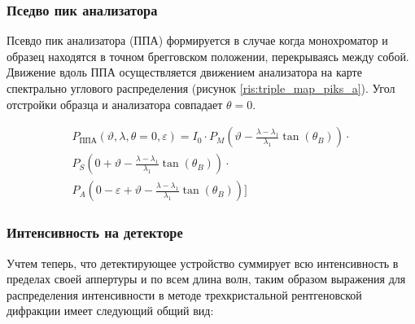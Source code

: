  \subsubsection*{Пседво пик анализатора}
 Псевдо пик анализатора (ППА) формируется в случае когда монохроматор и образец
 находятся в точном брегговском положении, перекрываясь между собой. Движение вдоль ППА осуществляется
 движением анализатора  на карте спектрально углового распределения (рисунок \ref{ris:triple_map_piks_a}).
   Угол отстройки образца и анализатора совпадает $\theta = 0$.

 \begin{eqnarray} \label{eq:triplr_spectra_angle_map_PPM}
   P_{\text{ППА}}(\vartheta,\lambda,\theta=0,\varepsilon) =I_0\cdot
     P_M \left(\vartheta - \frac{\lambda - \lambda_1}{\lambda_1}\tan(\theta_B) \right) \cdot \nonumber \\
    P_S \left(0 + \vartheta - \frac{\lambda - \lambda_1}{\lambda_1}\tan(\theta_B)\right)  \cdot  \nonumber \\
    P_A \left(0-\varepsilon  + \vartheta - \frac{\lambda - \lambda_1}{\lambda_1}\tan(\theta_B)\right) \Bigg]
  \end{eqnarray}


\subsubsection*{Интенсивность на детекторе}

Учтем теперь, что детектирующее устройство суммирует всю интенсивность в пределах своей аппертуры и по всем длина волн,
таким образом выражения для распределения интенсивности в методе трехкристальной рентгеновской дифракции имеет следующий
общий вид:

